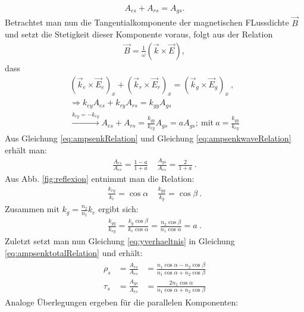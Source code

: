 \begin{gather}
	A_{es} + A_{rs} = A_{gs}.
	\label{eq:ampsenkRelation}
\end{gather}
Betrachtet man nun die Tangentialkomponente der magnetischen FLussdichte $\vec{B}$ und setzt die Stetigkeit dieser Komponente voraus, folgt aus der Relation
\begin{gather}
	\vec{B} = \frac{1}{\omega} \left( \vec{k} \times \vec{E} \right),
	\label{eq:bfeldRelation}
\end{gather}
dass
\begin{gather}
	\left( \vec{k}_e \times \vec{E}_e \right)_x + \left( \vec{k}_r \times \vec{E}_r \right)_x = \left( \vec{k}_g \times \vec{E}_g \right)_x~,\\[0.2cm]
	\Rightarrow k_{ey}A_{es} + k_{ry}A_{rs} = k_{gy}A_{gs} \\[0.2cm]
	\xrightarrow{k_{ry} = -k_{ey}} A_{es} + A_{rs} = \frac{k_{gy}}{k_{ey}}A_{gs} = a A_{gs};~\mathrm{mit}~a=\frac{k_{gy}}{k_{ey}}
	\label{eq:ampsenkwaveRelation}
\end{gather}
Aus Gleichung \ref{eq:ampsenkRelation} und Gleichung \ref{eq:ampsenkwaveRelation}  erhält man:
\begin{gather}
	\frac{A_{rs}}{A_{es}} = \frac{1-a}{1+a}~~~~~\frac{A_{gs}}{A_{es}} = \frac{2}{1+a}~.
	\label{eq:ampsenktotalRelation}
\end{gather}
Aus Abb. \ref{fig:reflexion} entnimmt man die Relation:
\begin{gather}
	\frac{k_{ey}}{k_e} = \cos\alpha~~~~~\frac{k_{gy}}{k_g} = \cos\beta~.
	\label{eq:wavetriRealation}
\end{gather}
Zusammen mit $k_g = \frac{n_2}{n_1}k_e$ ergibt sich:
\begin{gather}
	\frac{k_{gy}}{k_{ey}} = \frac{k_g\cos\beta}{k_e\cos\alpha} = \frac{n_2\cos\beta}{n_1\cos\alpha} = a ~.
	\label{eq:yverhaeltnis}
\end{gather}
Zuletzt setzt man nun Gleichung \ref{eq:yverhaeltnis} in Gleichung \ref{eq:ampsenktotalRelation} und erhält:
\begin{gather}
	\boxed{
	\begin{aligned}
		\rho_s &= \frac{A_{rs}}{A_{es}} &= \frac{n_1\cos\alpha - n_2\cos\beta}{n_1\cos\alpha + n_2\cos\beta}\\
		\tau_s &= \frac{A_{gs}}{A_{es}} &= \frac{2n_1\cos\alpha}{n_1\cos\alpha + n_2\cos\beta}
	\end{aligned}
	}
	\label{eq:fresnelsenk}
\end{gather}
Analoge Überlegungen ergeben für die parallelen Komponenten:
